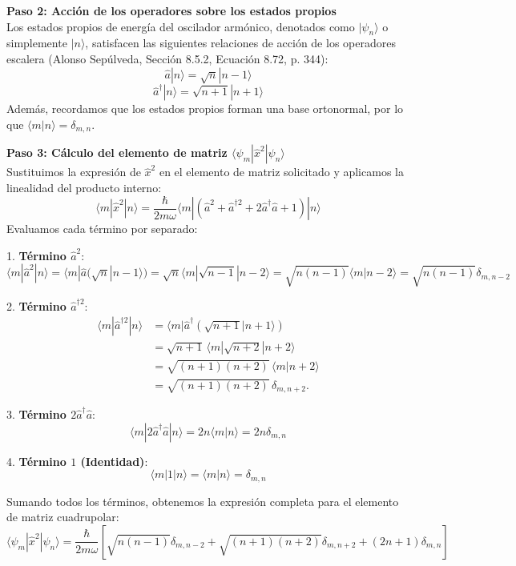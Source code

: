 \documentclass[a4paper]{article}
\begin{document}
\vspace{0.3cm}
\noindent\textbf{Paso 2: Acción de los operadores sobre los estados propios} \\
Los estados propios de energía del oscilador armónico, denotados como $|\psi_n\rangle$ o simplemente $|n\rangle$, satisfacen las siguientes relaciones de acción de los operadores escalera (Alonso Sepúlveda, Sección 8.5.2, Ecuación 8.72, p. 344):
$$
\hat{a} |n\rangle = \sqrt{n} |n-1\rangle
$$
$$
\hat{a}^\dagger |n\rangle = \sqrt{n+1} |n+1\rangle
$$
Además, recordamos que los estados propios forman una base ortonormal, por lo que $\langle m | n \rangle = \delta_{m,n}$.

\vspace{0.3cm}
\noindent\textbf{Paso 3: Cálculo del elemento de matriz $\langle \psi_m | \hat{x}^2 | \psi_n \rangle$} \\
Sustituimos la expresión de $\hat{x}^2$ en el elemento de matriz solicitado y aplicamos la linealidad del producto interno:
$$
\langle m | \hat{x}^2 | n \rangle = \frac{\hbar}{2m\omega} \langle m | \left( \hat{a}^2 + \hat{a}^{\dagger 2} + 2\hat{a}^\dagger\hat{a} + 1 \right) | n \rangle
$$
Evaluamos cada término por separado:

1. \textbf{Término $\hat{a}^2$}:
$$
\langle m | \hat{a}^2 | n \rangle = \langle m | \hat{a} (\sqrt{n} |n-1\rangle) = \sqrt{n} \langle m | \sqrt{n-1} |n-2\rangle = \sqrt{n(n-1)} \langle m | n-2 \rangle = \sqrt{n(n-1)} \delta_{m, n-2}
$$

2. \textbf{Término $\hat{a}^{\dagger 2}$}:
\begin{align*}
\langle m | \hat{a}^{\dagger 2} | n \rangle
&= \langle m | \hat{a}^\dagger (\sqrt{n+1} |n+1\rangle) \\
&= \sqrt{n+1}\,\langle m | \sqrt{n+2} |n+2\rangle \\
&= \sqrt{(n+1)(n+2)}\,\langle m | n+2 \rangle \\
&= \sqrt{(n+1)(n+2)}\,\delta_{m, n+2}.
\end{align*}

3. \textbf{Término $2\hat{a}^\dagger\hat{a}$}:
$$
\langle m | 2\hat{a}^\dagger\hat{a} | n \rangle = 2n \langle m | n \rangle = 2n \delta_{m, n}
$$

4. \textbf{Término $1$ (Identidad)}:
$$
\langle m | 1 | n \rangle = \langle m | n \rangle = \delta_{m, n}
$$

Sumando todos los términos, obtenemos la expresión completa para el elemento de matriz cuadrupolar:
$$
\langle \psi_m | \hat{x}^2 | \psi_n \rangle = \frac{\hbar}{2m\omega} \left[ \sqrt{n(n-1)} \delta_{m, n-2} + \sqrt{(n+1)(n+2)} \delta_{m, n+2} + (2n+1) \delta_{m, n} \right]
$$
\end{document}
